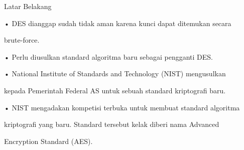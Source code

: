 \documentclass{article}
\begin{document}

Latar Belakang

• DES dianggap sudah tidak aman karena kunci dapat ditemukan secara 

brute-force.

• Perlu diusulkan standard algoritma baru sebagai pengganti DES.

• National Institute of Standards and Technology  (NIST) mengusulkan 

kepada Pemerintah Federal AS untuk sebuah standard kriptografi baru.

• NIST mengadakan kompetisi terbuka untuk membuat standard algoritma 

kriptografi yang baru. Standard tersebut kelak diberi nama Advanced 

Encryption Standard (AES).
\end{document}
